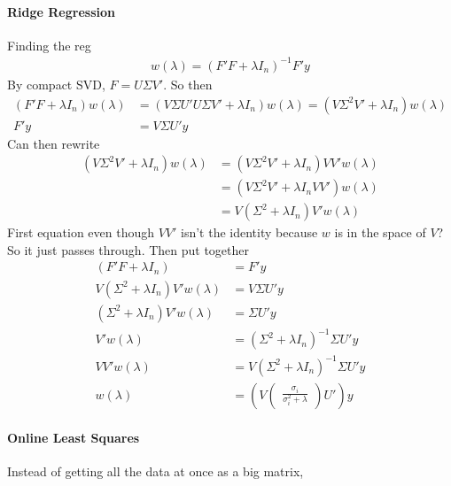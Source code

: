 \documentclass[12pt]{book}
\numberwithin{equation}{section} %
\theoremstyle{plain}
\theoremstyle{definition}
\theoremstyle{remark}
\begin{document}
\paragraph{Ridge Regression}
Finding the reg
\begin{align*}
  w(\lambda)
  = (F'F+\lambda I_n)^{-1}F'y
\end{align*}
By compact SVD, $F=U\Sigma V'$.
So then
\begin{align*}
  (F'F+\lambda I_n)
  w(\lambda)
  &=
  (V\Sigma U'U\Sigma V'+\lambda I_n) w(\lambda)
  =
  (V\Sigma^2 V'+\lambda I_n) w(\lambda)
  \\
  F'y
  &= V\Sigma U'y
\end{align*}
Can then rewrite
\begin{align*}
  (V\Sigma^2 V'+\lambda I_n) w(\lambda)
  &= (V\Sigma^2 V'+\lambda I_n) VV'w(\lambda)
  \\
  &= (V\Sigma^2 V'+\lambda I_n VV') w(\lambda)
  \\
  &= V(\Sigma^2 +\lambda I_n )V' w(\lambda)
\end{align*}
First equation even though $VV'$ isn't the identity because $w$ is in
the space of $V$?  So it just passes through.
Then put together
\begin{align*}
  (F'F+\lambda I_n)
  &=
  F'y
  \\
  V(\Sigma^2 +\lambda I_n )V' w(\lambda)
  &= V\Sigma U'y
  \\
  (\Sigma^2 +\lambda I_n )V' w(\lambda)
  &= \Sigma U'y
  \\
  V' w(\lambda)
  &= (\Sigma^2 +\lambda I_n )^{-1}\Sigma U'y
  \\
  VV' w(\lambda)
  &= V(\Sigma^2 +\lambda I_n )^{-1}\Sigma U'y
  \\
  w(\lambda)
  &=
  \left(
    V
    \begin{pmatrix}
      \frac{\sigma_i}{\sigma_i^2+\lambda}
    \end{pmatrix}
    U'
  \right)y
\end{align*}
\paragraph{Online Least Squares}
Instead of getting all the data at once as a big matrix,
\end{document}
